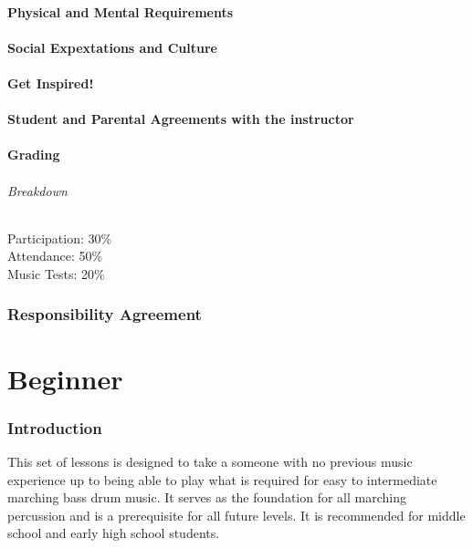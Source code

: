 \documentclass[12pt,letterpaper]{book}
\begin{document}
\subsection*{Physical and Mental Requirements}
\subsection*{Social Expextations and Culture}
\subsection*{Get Inspired!}
\subsection*{Student and Parental Agreements with the instructor}

\subsection*{Grading}
\paragraph{Breakdown}
Participation: 30\%\\
Attendance: 50\%\\
Music Tests: 20\%\\
\newpage

\section*{Responsibility Agreement}







\part{Beginner}

\section*{Introduction}

This set of lessons is designed to take a someone with no previous music experience up to being able to play what is required for easy to intermediate marching bass drum music.  It serves as the foundation for all marching percussion and is a prerequisite for all future levels.  It is recommended for middle school and early high school students.
\end{document}
